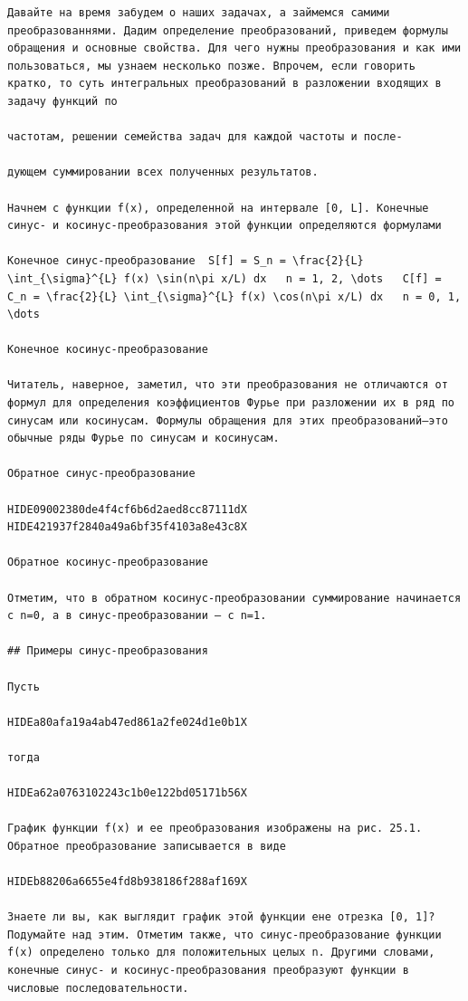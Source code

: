 \documentclass[
  ukrainian,
]{article}
\begin{document}
\begin{verbatim}
Давайте на время забудем о наших задачах, а займемся самими преобразованнями. Дадим определение преобразований, приведем формулы обращения и основные свойства. Для чего нужны преобразования и как ими пользоваться, мы узнаем несколько позже. Впрочем, если говорить кратко, то суть интегральных преобразований в разложении входящих в задачу функций по

частотам, решении семейства задач для каждой частоты и после-

дующем суммировании всех полученных результатов.

Начнем с функции f(x), определенной на интервале [0, L]. Конечные синус- и косинус-преобразования этой функции определяются формулами

Конечное синус-преобразование  S[f] = S_n = \frac{2}{L} \int_{\sigma}^{L} f(x) \sin(n\pi x/L) dx   n = 1, 2, \dots   C[f] = C_n = \frac{2}{L} \int_{\sigma}^{L} f(x) \cos(n\pi x/L) dx   n = 0, 1, \dots 

Конечное косинус-преобразование

Читатель, наверное, заметил, что эти преобразования не отличаются от формул для определения коэффициентов Фурье при разложении их в ряд по синусам или косинусам. Формулы обращения для этих преобразований—это обычные ряды Фурье по синусам и косинусам.

Обратное синус-преобразование

HIDE09002380de4f4cf6b6d2aed8cc87111dX HIDE421937f2840a49a6bf35f4103a8e43c8X

Обратное косинус-преобразование

Отметим, что в обратном косинус-преобразовании суммирование начинается с n=0, а в синус-преобразовании — с n=1.

## Примеры синус-преобразования

Пусть

HIDEa80afa19a4ab47ed861a2fe024d1e0b1X

тогда

HIDEa62a0763102243c1b0e122bd05171b56X

График функции f(x) и ее преобразования изображены на рис. 25.1. Обратное преобразование записывается в виде

HIDEb88206a6655e4fd8b938186f288af169X

Знаете ли вы, как выглядит график этой функции ене отрезка [0, 1]? Подумайте над этим. Отметим также, что синус-преобразование функции f(x) определено только для положительных целых n. Другими словами, конечные синус- и косинус-преобразования преобразуют функции в числовые последовательности.


\end{verbatim}
\end{document}
